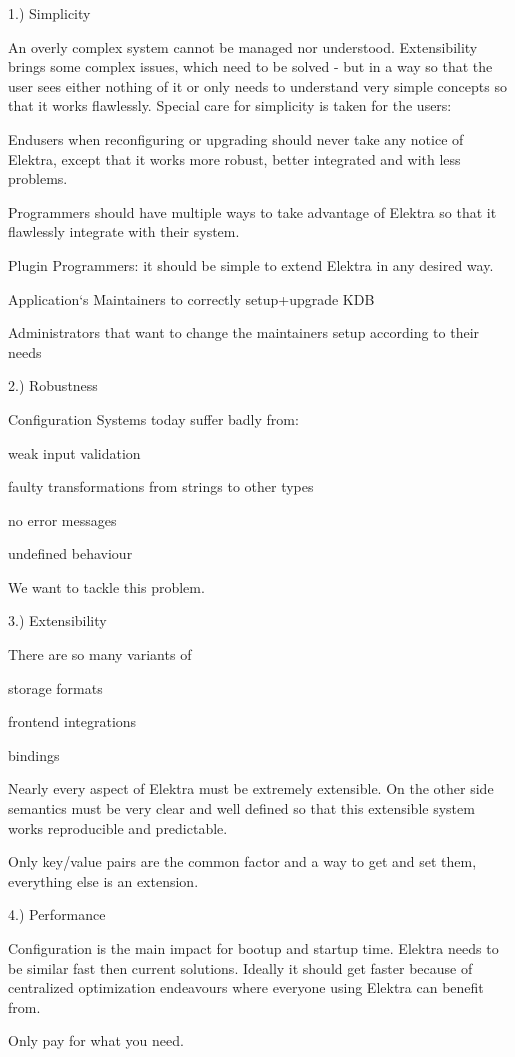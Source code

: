 1.) Simplicity

An overly complex system cannot be managed nor understood. Extensibility brings some complex issues, which need to be solved -\/ but in a way so that the user sees either nothing of it or only needs to understand very simple concepts so that it works flawlessly. Special care for simplicity is taken for the users\+:


\begin{DoxyItemize}
\item Endusers when reconfiguring or upgrading should never take any notice of Elektra, except that it works more robust, better integrated and with less problems.
\item Programmers should have multiple ways to take advantage of Elektra so that it flawlessly integrate with their system.
\item Plugin Programmers\+: it should be simple to extend Elektra in any desired way.
\item Application`s Maintainers to correctly setup+upgrade K\+D\+B
\item Administrators that want to change the maintainers setup according to their needs
\end{DoxyItemize}

2.) Robustness

Configuration Systems today suffer badly from\+:


\begin{DoxyItemize}
\item weak input validation
\item faulty transformations from strings to other types
\item no error messages
\item undefined behaviour
\end{DoxyItemize}

We want to tackle this problem.

3.) Extensibility

There are so many variants of


\begin{DoxyItemize}
\item storage formats
\item frontend integrations
\item bindings
\end{DoxyItemize}

Nearly every aspect of Elektra must be extremely extensible. On the other side semantics must be very clear and well defined so that this extensible system works reproducible and predictable.

Only key/value pairs are the common factor and a way to get and set them, everything else is an extension.

4.) Performance

Configuration is the main impact for bootup and startup time. Elektra needs to be similar fast then current solutions. Ideally it should get faster because of centralized optimization endeavours where everyone using Elektra can benefit from.

Only pay for what you need. 